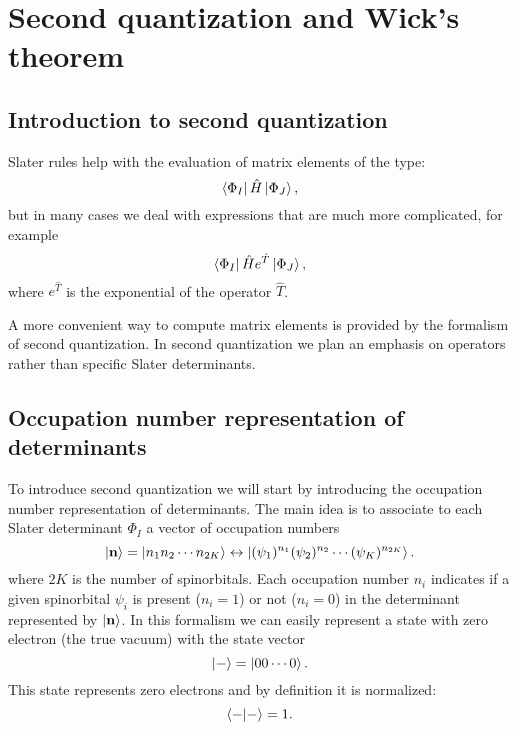 \documentclass[../Main/chem532-notes.tex]{subfiles}
\begin{document}
\chapter{Second quantization and Wick's theorem}

\section{Introduction to second quantization}

Slater rules help with the evaluation of matrix elements of the type:
\begin{equation}
\bra{\Phi_I} \hat{H} \ket{\Phi_J},
\end{equation}
but in many cases we deal with expressions that are much more complicated, for example
\begin{equation}
\bra{\Phi_I} \hat{H} e^{\hat{T}} \ket{\Phi_J},
\end{equation}
where $e^{\hat{T}}$ is the exponential of the operator $\hat{T}$.

A more convenient way to compute matrix elements is provided by the formalism of second quantization.
In second quantization we plan an emphasis on operators rather than specific Slater determinants.

\section{Occupation number representation of determinants}

To introduce second quantization we will start by introducing the occupation number representation of determinants.
The main idea is to associate to each Slater determinant $\Phi_I$ a vector of occupation numbers
\begin{equation}
\ket{\mathbf{n}} = \ket{n_1 n_2 \cdots n_{2K}} \leftrightarrow \ket{(\psi_1)^{n_1} (\psi_2)^{n_2} \cdots (\psi_K)^{n_{2K}} }.
\end{equation}
where $2K$ is the number of spinorbitals. Each occupation number $n_i$ indicates if a given spinorbital $\psi_i$ is present ($n_i = 1$) or not ($n_i = 0$) in the determinant represented by $\ket{\mathbf{n}}$.
In this formalism we can easily represent a state with zero electron (the true vacuum) with the state vector
\begin{equation}
\ket{-} = \ket{0 0 \cdots 0}.
\end{equation}
This state represents zero electrons and by definition it is normalized:
\begin{equation}
\braket{-|-} = 1.
\end{equation}
\end{document}
